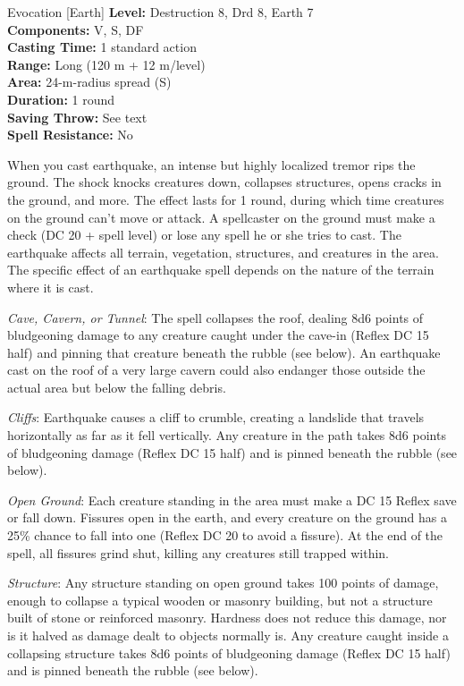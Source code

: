 {Evocation [Earth]}
{
	\textbf{Level:}
	Destruction 8, Drd 8, Earth 7\\
	\textbf{Components:}
	V, S, DF\\
	\textbf{Casting Time:}
	1 standard action\\
	\textbf{Range:}
	Long (120 m + 12 m/level)\\
	\textbf{Area:}
	24-m-radius spread (S)\\
	\textbf{Duration:}
	1 round\\
	\textbf{Saving Throw:}
	See text\\
	\textbf{Spell Resistance:}
	No\\
}
{
	When you cast earthquake, an intense but highly localized tremor rips the ground. The shock knocks creatures down, collapses structures, opens cracks in the ground, and more. The effect lasts for 1 round, during which time creatures on the ground can't move or attack. A spellcaster on the ground must make a  check (DC 20 + spell level) or lose any spell he or she tries to cast. The earthquake affects all terrain, vegetation, structures, and creatures in the area. The specific effect of an earthquake spell depends on the nature of the terrain where it is cast.

	\textit{Cave, Cavern, or Tunnel}:
	The spell collapses the roof, dealing 8d6 points of bludgeoning damage to any creature caught under the cave-in (Reflex DC 15 half) and pinning that creature beneath the rubble (see below). An earthquake cast on the roof of a very large cavern could also endanger those outside the actual area but below the falling debris.

	\textit{Cliffs}:
	Earthquake causes a cliff to crumble, creating a landslide that travels horizontally as far as it fell vertically. Any creature in the path takes 8d6 points of bludgeoning damage (Reflex DC 15 half) and is pinned beneath the rubble (see below).

	\textit{Open Ground}:
	Each creature standing in the area must make a DC 15 Reflex save or fall down. Fissures open in the earth, and every creature on the ground has a 25\% chance to fall into one (Reflex DC 20 to avoid a fissure). At the end of the spell, all fissures grind shut, killing any creatures still trapped within.

	\textit{Structure}:
	Any structure standing on open ground takes 100 points of damage, enough to collapse a typical wooden or masonry building, but not a structure built of stone or reinforced masonry. Hardness does not reduce this damage, nor is it halved as damage dealt to objects normally is. Any creature caught inside a collapsing structure takes 8d6 points of bludgeoning damage (Reflex DC 15 half) and is pinned beneath the rubble (see below).

}
